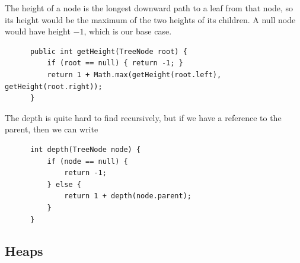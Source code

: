   \begin{definition}
    The height of a node is the longest downward path to a leaf from that node, so its height would be the maximum of the two heights of its children. A null node would have height $-1$, which is our base case. 
    \begin{lstlisting}
      public int getHeight(TreeNode root) {
          if (root == null) { return -1; }
          return 1 + Math.max(getHeight(root.left), getHeight(root.right)); 
      }
    \end{lstlisting}
  \end{definition}

  \begin{definition}
    The depth is quite hard to find recursively, but if we have a reference to the parent, then we can write 
    \begin{lstlisting}
      int depth(TreeNode node) {
          if (node == null) {
              return -1;
          } else {
              return 1 + depth(node.parent);
          }
      }
    \end{lstlisting}
  \end{definition}

\subsection{Heaps}

